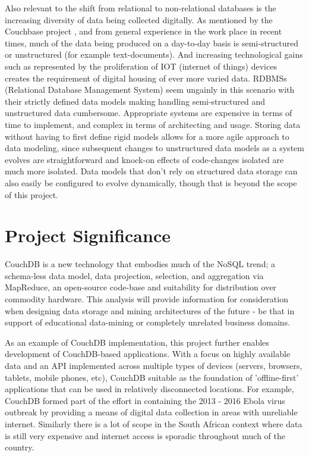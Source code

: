 Also relevant to the shift from relational to non-relational databases is the increasing diversity of data being collected digitally. As mentioned by the Couchbase project \cite{couchbaseWhitePaper}, and from general experience in the work place in recent times, much of the data being produced on a day-to-day basis is semi-structured or unstructured (for example text-documents). And increasing technological gains such as represented by the proliferation of IOT (internet of things) devices creates the requirement of digital housing of ever more varied data. RDBMSs (Relational Database Management System) seem ungainly in this scenario with their strictly defined data models making handling semi-structured and unstructured data cumbersome. Appropriate systems are expensive in terms of time to implement, and complex in terms of architecting and usage. Storing data without having to first define rigid models allows for a more agile approach to data modeling, since subsequent changes to unstructured data models as a system evolves are straightforward and knock-on effects of code-changes isolated are much more isolated. Data models that don't rely on structured data storage can also easily be configured to evolve dynamically, though that is beyond the scope of this project.

\section{Project Significance}
CouchDB is a new technology that embodies much of the NoSQL trend; a schema-less data model, data projection, selection, and aggregation via MapReduce, an open-source code-base and suitability for distribution over commodity hardware. This analysis will provide information for consideration when designing data storage and mining architectures of the future - be that in support of educational data-mining or completely unrelated business domains.

As an example of CouchDB implementation, this project further enables development of CouchDB-based applications. With a focus on highly available data and an API implemented across multiple types of devices (servers, browsers, tablets, mobile phones, etc), CouchDB suitable as the foundation of 'offline-first' applications that can be used in relatively disconnected locations. For example, CouchDB formed part of the effort in containing the 2013 - 2016 Ebola virus outbreak \cite{ebola2017} by providing a means of digital data collection in areas with unreliable internet. Similarly there is a lot of scope in the South African context where data is still very expensive and internet access is sporadic throughout much of the country.


